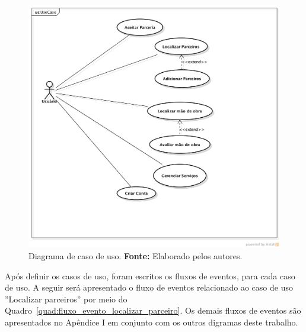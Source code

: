 \newpage
\begin{figure}[h!]
	\centerline{\includegraphics[scale=0.5]{./imagens/caso-de-uso-unificado.png}}
	\caption[Diagrama de caso de uso]
	{Diagrama de caso de uso. \textbf{Fonte:} Elaborado pelos autores.}
	\label{fig:caso_uso_unificado}
\end{figure}



\par Após definir os casos de uso, foram escritos os fluxos de eventos, para cada caso de uso. A seguir será apresentado o fluxo de eventos relacionado ao caso de uso ''Localizar parceiros'' por meio do Quadro~\ref{quad:fluxo_evento_localizar_parceiro}. Os demais fluxos de eventos são apresentados no Apêndice I em conjunto com os outros digramas deste trabalho.

